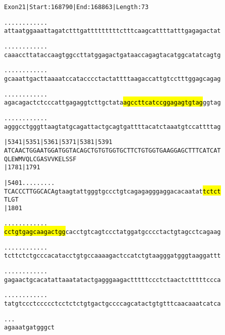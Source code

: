 \documentclass{article}
\begin{document}
\begin{alltt}
Exon 21 | Start: 168790 | End: 168863 | Length: 73

.    .    .    .    .    .    .    .    .    .    .    .    
attaatggaaattagatctttgatttttttttctttcaagcattttatttgagagactat

.    .    .    .    .    .    .    .    .    .    .    .    
caaaccttataccaagtggccttatggagactgataaccagagtacatggcatatcagtg

.    .    .    .    .    .    .    .    .    .    .    .    
gcaaattgacttaaaatccatacccctactattttaagaccattgtcctttggagcagag

.    .    .    .    .    .    .    .    .    .    .    .    
agacagactctcccattgagaggtcttgctata\hl{agccttcatccggagagtgtag}ggtag

.    .    .    .    .    .    .    .    .    .    .    .    
agggcctgggttaagtatgcagattactgcagtgattttacatctaaatgtccattttag

        |5341     |5351     |5361     |5371     |5381     |5391
ATCAACTGGAATGGATGGTACAGCTGTGTGGTGCTTCTGTGGTGAAGGAGCTTTCATCAT
  Q  L  E  W  M  V  Q  L  C  G  A  S  V  V  K  E  L  S  S  F
        |1781                         |1791                 

        |5401     .    .    .    .    .    .    .    .    . 
TCACCCTTGGCACAgtaagtattgggtgccctgtcagagagggaggacacaatat\hl{tctct}
  T  L  G  T                                                
        |1801                                               

   .    .    .    .    .    .    .    .    .    .    .    . 
\hl{cctgtgagcaagactgg}cacctgtcagtccctatggatgcccctactgtagcctcagaag

   .    .    .    .    .    .    .    .    .    .    .    . 
tcttctctgcccacatacctgtgccaaaagactccatctgtaagggatgggtaaggattt

   .    .    .    .    .    .    .    .    .    .    .    . 
gagaactgcacatattaaatatactgagggaagactttttccctctaactctttttccca

   .    .    .    .    .    .    .    .    .    .    .    . 
tatgtccctccccctcctctctgtgactgccccagcatactgtgtttcaacaaatcatca

   .    .    .
agaaatgatgggct
\end{alltt}
\newpage
\end{document}
